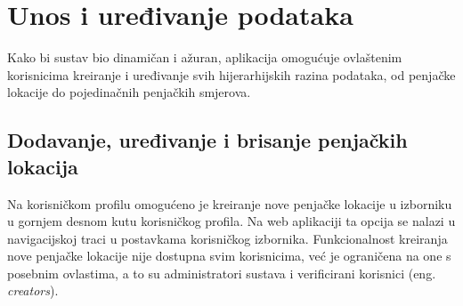 \section{Unos i uređivanje podataka}

Kako bi sustav bio dinamičan i ažuran, aplikacija omogućuje ovlaštenim korisnicima kreiranje i uređivanje svih hijerarhijskih razina podataka, od penjačke lokacije do pojedinačnih penjačkih smjerova.

\subsection{Dodavanje, uređivanje i brisanje penjačkih lokacija}

Na korisničkom profilu omogućeno je kreiranje nove penjačke lokacije u izborniku u gornjem desnom kutu korisničkog profila. Na web aplikaciji ta opcija se nalazi u navigacijskoj traci u postavkama korisničkog izbornika. Funkcionalnost kreiranja nove penjačke lokacije nije dostupna svim korisnicima, već je ograničena na one s posebnim ovlastima, a to su administratori sustava i verificirani korisnici (eng. \textit{creators}). 

